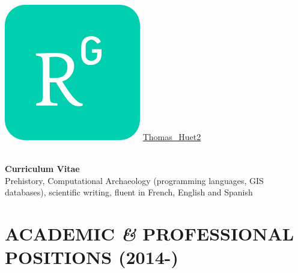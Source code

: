 \documentclass{article}
\begin{document}
\includegraphics[scale=0.05]{rgate} \quad \href{https://www.researchgate.net/profile/Thomas\_Huet2}{Thomas\_Huet2} \\
\\

\begin{adjustwidth}{100pt}{100pt}
\begin{center}
\LARGE{\textbf{Curriculum Vitae}}\\
\large{Prehistory, Computational Archaeology (programming languages, GIS databases), scientific writing, fluent in French, English and Spanish} 
\end{center}
\end{adjustwidth}


\tableofcontents

\section{ACADEMIC \textit{\&} PROFESSIONAL POSITIONS (2014-)}
\end{document}
